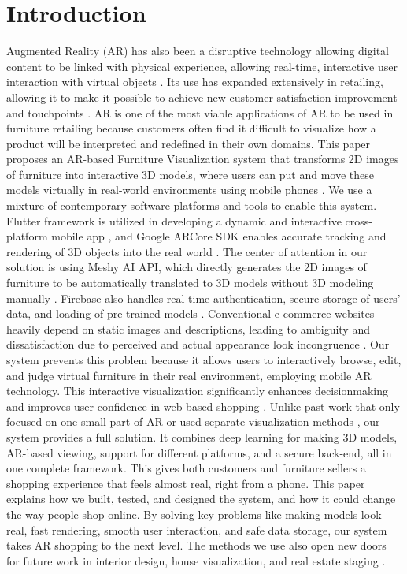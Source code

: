 \documentclass[12pt, a4paper]{article}
\begin{document}
\section{Introduction}
Augmented Reality (AR) has also been a disruptive technology allowing digital content to be linked with physical experience, allowing real-time, interactive user interaction with virtual objects \cite{ref1}. Its use has expanded extensively in retailing, allowing it to make it possible to achieve new customer satisfaction improvement and touchpoints \cite{ref15,ref16}. AR is one of the most viable applications of AR to be used in furniture retailing because customers often find it difficult to visualize how a product will be interpreted and redefined in their own domains. This paper proposes an AR-based Furniture Visualization system that transforms 2D images of furniture into interactive 3D models, where users can put and move these models virtually in real-world environments using mobile phones \cite{ref11,ref12}. We use a mixture of contemporary software platforms and tools to enable this system. Flutter framework is utilized in developing a dynamic and interactive cross-platform mobile app \cite{ref3,ref9,ref17}, and Google ARCore SDK enables accurate tracking and rendering of 3D objects into the real world \cite{ref2,ref7}. The center of attention in our solution is using Meshy AI API, which directly generates the 2D images of furniture to be automatically translated to 3D models without 3D modeling manually \cite{ref5}. Firebase also handles real-time authentication, secure storage of users' data, and loading of pre-trained models \cite{ref4,ref18,ref19}. Conventional e-commerce websites heavily depend on static images and descriptions, leading to ambiguity and dissatisfaction due to perceived and actual appearance look incongruence \cite{ref8,ref11}. Our system prevents this problem because it allows users to interactively browse, edit, and judge virtual furniture in their real environment, employing mobile AR technology. This interactive visualization significantly enhances decisionmaking and improves user confidence in web-based shopping \cite{ref6,ref14}. Unlike past work that only focused on one small part of AR or used separate visualization methods \cite{ref13}, our system provides a full solution. It combines deep learning for making 3D models, AR-based viewing, support for different platforms, and a secure back-end, all in one complete framework. This gives both customers and furniture sellers a shopping experience that feels almost real, right from a phone. This paper explains how we built, tested, and designed the system, and how it could change the way people shop online. By solving key problems like making models look real, fast rendering, smooth user interaction, and safe data storage, our system takes AR shopping to the next level. The methods we use also open new doors for future work in interior design, house visualization, and real estate staging \cite{ref6,ref13,ref20}.
\end{document}
